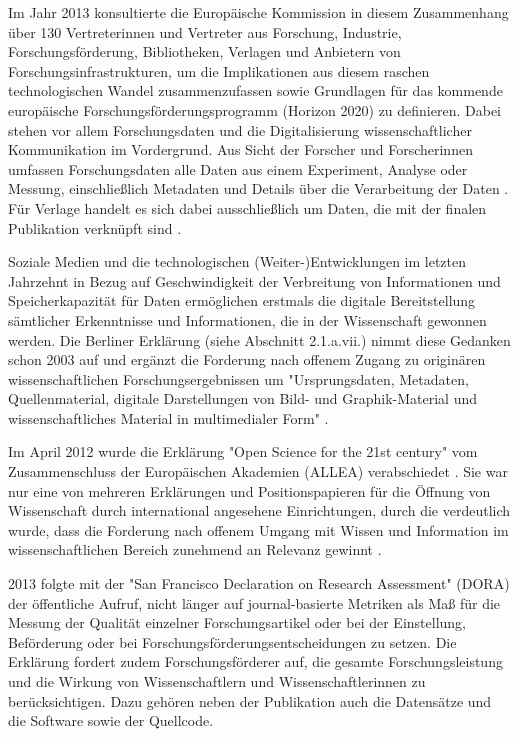 Im Jahr 2013 konsultierte die Europäische Kommission in diesem Zusammenhang über 130 Vertreterinnen und Vertreter aus Forschung, Industrie, Forschungsförderung, Bibliotheken, Verlagen und Anbietern von Forschungsinfrastrukturen, um die Implikationen aus diesem raschen technologischen Wandel zusammenzufassen sowie Grundlagen für das kommende europäische Forschungsförderungsprogramm (Horizon 2020) zu definieren. Dabei stehen vor allem Forschungsdaten und die Digitalisierung wissenschaftlicher Kommunikation im Vordergrund. Aus Sicht der Forscher und Forscherinnen umfassen Forschungsdaten alle Daten aus einem Experiment, Analyse oder Messung, einschließlich Metadaten und Details über die Verarbeitung der Daten \cite{European_Commission_2013}. Für Verlage handelt es sich dabei ausschließlich um Daten, die mit der finalen Publikation verknüpft sind \cite{European_Commission_2013}.

Soziale Medien und die technologischen (Weiter-)Entwicklungen im letzten Jahrzehnt in Bezug auf Geschwindigkeit der Verbreitung von Informationen und Speicherkapazität für Daten ermöglichen erstmals die digitale Bereitstellung sämtlicher Erkenntnisse und Informationen, die in der Wissenschaft gewonnen werden. Die Berliner Erklärung (siehe Abschnitt 2.1.a.vii.) nimmt diese Gedanken schon 2003 auf und ergänzt die Forderung nach offenem Zugang zu originären wissenschaftlichen Forschungsergebnissen um "Ursprungsdaten, Metadaten, Quellenmaterial, digitale Darstellungen von Bild- und Graphik-Material und wissenschaftliches Material in multimedialer Form" \cite{Berliner_Erklaerung_2003}.

Im April 2012 wurde die Erklärung "Open Science for the 21st century" vom Zusammenschluss der Europäischen Akademien (ALLEA) verabschiedet \cite{ALLEA_2012}. Sie war nur eine von mehreren Erklärungen und Positionspapieren für die Öffnung von Wissenschaft durch international angesehene Einrichtungen, durch die verdeutlich wurde, dass die Forderung nach offenem Umgang mit Wissen und Information im wissenschaftlichen Bereich zunehmend an Relevanz gewinnt \cite{Schulze_2013}.

2013 folgte mit der "San Francisco Declaration on Research Assessment" (DORA) \cite{DORA_2013} der öffentliche Aufruf, nicht länger auf journal-basierte Metriken als Maß für die Messung der Qualität einzelner Forschungsartikel oder bei der Einstellung, Beförderung oder bei Forschungsförderungsentscheidungen zu setzen. Die Erklärung fordert zudem Forschungsförderer auf, die gesamte Forschungsleistung und die Wirkung von Wissenschaftlern und Wissenschaftlerinnen zu berücksichtigen. Dazu gehören neben der Publikation auch die Datensätze und die Software sowie der Quellcode.

